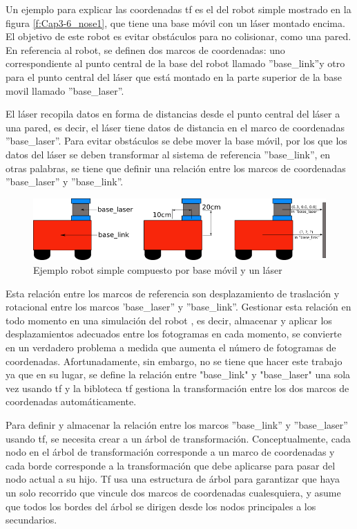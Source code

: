 Un ejemplo para explicar las coordenadas tf es el del robot simple  mostrado en la figura \eqref{f:Cap3-6_nose1}, que tiene una base móvil con un láser montado encima. El objetivo de este robot es evitar obstáculos para no colisionar, como una pared.
En referencia al robot, se definen dos marcos de coordenadas: uno correspondiente al punto central de la base del robot llamado ''base\_link''y otro para el punto central del láser que está montado en la parte superior de la base movil llamado ''base\_laser''. 

El láser recopila datos en forma de distancias desde el punto central del láser a una pared, es decir, el láser tiene datos de distancia en el marco de coordenadas ''base\_laser''. Para evitar obstáculos se debe mover la base móvil, por los que los datos del láser se deben transformar al sistema de referencia ''base\_link'', en otras palabras,  se tiene que definir una relación entre los marcos de coordenadas ''base\_laser'' y ''base\_link''.
 \newpage
 
        \begin{figure}[htb]
            \centering
            \includegraphics[width=1.0\linewidth]{Main/Chapter3/Images3/simple_robot.png}
            \caption{Ejemplo robot simple compuesto por base móvil y un láser}
            \label{f:Cap3-6_nose1}
        \end{figure}    

Esta relación entre los marcos de referencia son desplazamiento de traslación y rotacional entre los marcos 'base\_laser'' y ''base\_link''. Gestionar esta relación en todo momento en una simulación del robot , es decir, almacenar y aplicar los desplazamientos adecuados entre los fotogramas en cada momento, se convierte en un verdadero problema a medida que aumenta el número de fotogramas de coordenadas. Afortunadamente, sin embargo, no se tiene que hacer este trabajo ya que en su lugar, se define la relación entre "base\_link" y "base\_laser" una sola vez usando tf y la bibloteca tf gestiona la transformación entre los dos marcos de coordenadas automáticamente.

Para definir y almacenar la relación entre los marcos ''base\_link'' y ''base\_laser'' usando tf, se necesita crear a un árbol de transformación. Conceptualmente, cada nodo en el árbol de transformación corresponde a un marco de coordenadas y cada borde corresponde a la transformación que debe aplicarse para pasar del nodo actual a su hijo. Tf usa una estructura de árbol para garantizar que haya un solo recorrido que vincule dos marcos de coordenadas cualesquiera, y asume que todos los bordes del árbol se dirigen desde los nodos principales a los secundarios.    


